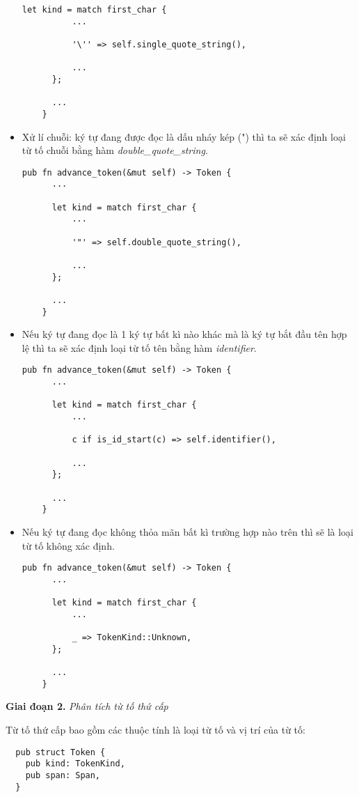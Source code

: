 \begin{itemize}
\begin{lstlisting}[]
      let kind = match first_char {
          ...
  
          '\'' => self.single_quote_string(),
 
          ...
      };
  
      ...
    } 
  \end{lstlisting}
  \item Xử lí chuỗi: ký tự đang được đọc là dấu nháy kép (") thì ta sẽ xác định loại từ tố chuỗi bằng hàm \textit{double\_quote\_string}. 
  \begin{lstlisting}[]
    pub fn advance_token(&mut self) -> Token {
      ...
  
      let kind = match first_char {
          ...
  
          '"' => self.double_quote_string(),
  
          ...
      };
  
      ...
    } 
  \end{lstlisting}
  \item Nếu ký tự đang đọc là 1 ký tự bất kì nào khác mà là ký tự bắt đầu tên hợp lệ thì ta sẽ xác định loại từ tố tên bằng hàm \textit{identifier}. 
  \begin{lstlisting}[]
    pub fn advance_token(&mut self) -> Token {
      ...
  
      let kind = match first_char {
          ...
  
          c if is_id_start(c) => self.identifier(),
  
          ...
      };
  
      ...
    } 
  \end{lstlisting}
  \item Nếu ký tự đang đọc không thỏa mãn bất kì trường hợp nào trên thì sẽ là loại từ tố không xác định.
  \begin{lstlisting}[]
    pub fn advance_token(&mut self) -> Token {
      ...
  
      let kind = match first_char {
          ...
  
          _ => TokenKind::Unknown,
      };
  
      ...
    } 
  \end{lstlisting}
\end{itemize}


\textbf{Giai đoạn 2.} \textit{Phân tích từ tố thứ cấp}

Từ tố thứ cấp bao gồm các thuộc tính là loại từ tố và vị trí của từ tố:
\begin{lstlisting}
  pub struct Token {
    pub kind: TokenKind,
    pub span: Span,
  }
\end{lstlisting}

